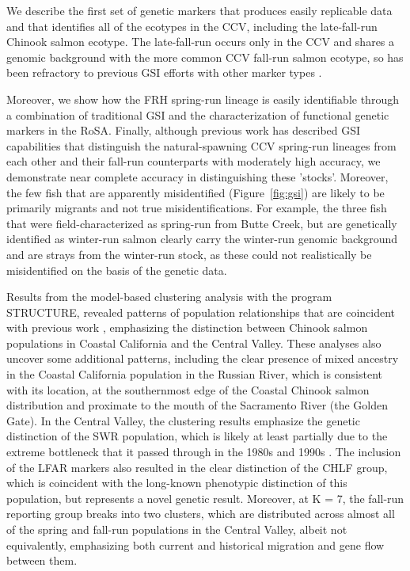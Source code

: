 We describe the first set of genetic markers that produces easily replicable data and
that identifies all of the ecotypes in the CCV, including the late-fall-run Chinook salmon ecotype.
The late-fall-run occurs only in the CCV and shares a genomic background with the more
common CCV fall-run salmon ecotype, so has been refractory to previous GSI efforts with other marker types \citep{seeb2007development,clemento2014evaluation,meek2016sequencing,thompson2024genomics}. 


Moreover, we show how the FRH spring-run lineage is
easily identifiable through a combination of traditional GSI and the characterization
of functional genetic markers in the RoSA. Finally, although previous work has described
GSI capabilities that distinguish the natural-spawning CCV spring-run lineages from
each other and their fall-run counterparts with moderately high accuracy, we demonstrate
near complete accuracy in distinguishing these 'stocks'. Moreover, the few fish that are
apparently misidentified (Figure~\ref{fig:gsi}) are likely to be primarily migrants and not true misidentifications.
For example, the three fish that were field-characterized as spring-run from Butte Creek, but are
genetically identified as winter-run salmon clearly carry the winter-run genomic background and
are strays from the winter-run stock, as these could not realistically be misidentified on the 
basis of the genetic data.

Results from the model-based clustering analysis with the program STRUCTURE, revealed patterns 
of population relationships that are coincident with previous work 
\citep{clemento2014evaluation,kinziger2013contemporary}, emphasizing
the distinction between Chinook salmon populations 
in Coastal California and the Central Valley. These analyses also uncover some additional patterns, 
including the clear presence of mixed ancestry in the Coastal California population in the 
Russian River, which is consistent with its location, at the southernmost edge of the 
Coastal Chinook salmon distribution and proximate to the mouth of the Sacramento River 
(the Golden Gate). In the Central Valley, the clustering results emphasize the genetic 
distinction of the SWR population, which is likely at least partially due to 
the extreme bottleneck that it passed through in the 1980s and 1990s \citep{hedrick1994effective}. The inclusion 
of the LFAR markers also resulted in the clear distinction of the CHLF group, which 
is coincident with the long-known phenotypic distinction of this population, but represents a novel 
genetic result. Moreover, at K = 7, the fall-run reporting group breaks into two clusters, 
which are distributed across almost all of the spring and fall-run populations in the 
Central Valley, albeit not equivalently, emphasizing both current and historical migration and 
gene flow between them. 

